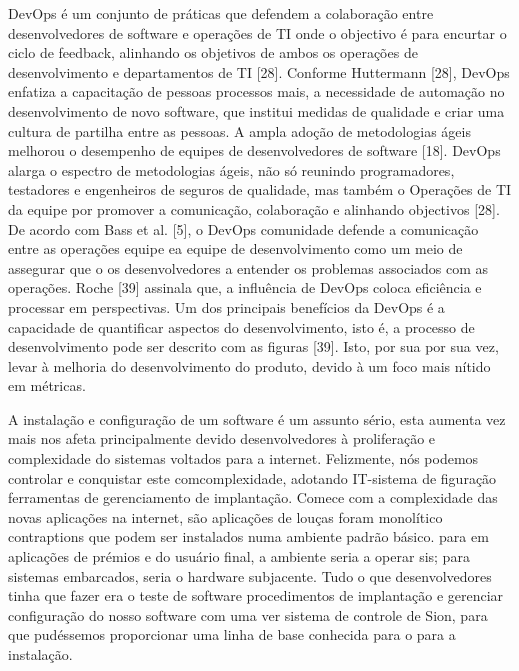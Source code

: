 DevOps é um conjunto de práticas que defendem a colaboração
entre desenvolvedores de software e operações de TI onde o objectivo é
para encurtar o ciclo de feedback, alinhando os objetivos de ambos os
operações de desenvolvimento e departamentos de TI [28]. Conforme
Huttermann [28], DevOps enfatiza a capacitação de pessoas
processos mais, a necessidade de automação no desenvolvimento de novo
software, que institui medidas de qualidade e criar uma cultura
de partilha entre as pessoas.
A ampla adoção de metodologias ágeis melhorou
o desempenho de equipes de desenvolvedores de software [18]. DevOps alarga
o espectro de metodologias ágeis, não só reunindo
programadores, testadores e engenheiros de seguros de qualidade, mas também o
Operações de TI da equipe por promover a comunicação, colaboração e
alinhando objectivos [28]. De acordo com Bass et al. [5], o DevOps
comunidade defende a comunicação entre as operações
equipe ea equipe de desenvolvimento como um meio de assegurar que o
os desenvolvedores a entender os problemas associados com as operações.
Roche [39] assinala que, a influência de DevOps coloca eficiência
e processar em perspectivas. Um dos principais benefícios da DevOps
é a capacidade de quantificar aspectos do desenvolvimento, isto é, a
processo de desenvolvimento pode ser descrito com as figuras [39]. Isto, por sua
por sua vez, levar à melhoria do desenvolvimento do produto, devido à
um foco mais nítido em métricas.


A instalação e configuração de um software é um assunto sério, esta aumenta
vez mais nos afeta principalmente devido desenvolvedores à proliferação e
complexidade do sistemas voltados para a internet. Felizmente, nós podemos
controlar e conquistar este comcomplexidade, adotando IT-sistema de figuração
ferramentas de gerenciamento de implantação. Comece com a complexidade das novas
aplicações na internet, são aplicações de louças foram monolítico contraptions
que podem ser instalados numa ambiente padrão básico. para em aplicações de
prémios e do usuário final, a ambiente seria a operar sis; para sistemas embarcados, seria
o hardware subjacente. Tudo o que desenvolvedores tinha que fazer era o teste de software
procedimentos de implantação e gerenciar configuração do nosso software com uma ver
 sistema de controle de Sion, para que pudéssemos proporcionar uma linha de base
 conhecida para o  para a instalação. \cite{6265084}


